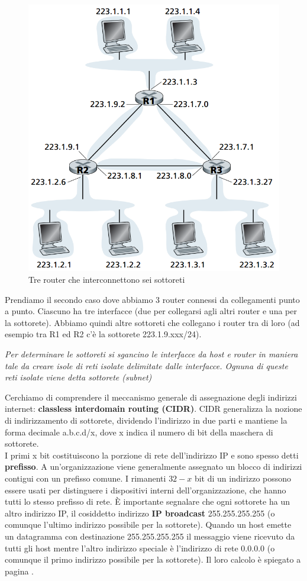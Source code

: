 \documentclass[11pt,a4paper]{book}
\begin{document}
\begin{figure}
	\includegraphics[scale=0.6]{img/055.png}
	\caption{Tre router che interconnettono sei sottoreti}
\end{figure}
Prendiamo il secondo caso dove abbiamo 3 router connessi da collegamenti punto a punto. Ciascuno ha tre interfacce (due per collegarsi agli altri router e una per la sottorete). Abbiamo quindi altre sottoreti che collegano i router tra di loro (ad esempio tra R1 ed R2 c'è la sottorete 223.1.9.xxx/24).
\begin{center}
	\textit{Per determinare le sottoreti si sgancino le interfacce da host e router in maniera tale da creare isole di reti isolate delimitate dalle interfacce. Ognuna di queste reti isolate viene detta sottorete (subnet)}
\end{center}
Cerchiamo di comprendere il meccanismo generale di assegnazione degli indirizzi internet: \textbf{classless interdomain routing (CIDR)}. CIDR generalizza la nozione di indirizzamento di sottorete, dividendo l'indirizzo in due parti e mantiene la forma decimale a.b.c.d/x, dove x indica il numero di bit della maschera di sottorete. \\
I primi x bit costituiscono la porzione di rete dell'indirizzo IP e sono spesso detti \textbf{prefisso}. A un'organizzazione viene generalmente assegnato un blocco di indirizzi contigui con un prefisso comune. I rimanenti $32-x$ bit di un indirizzo possono essere usati per distinguere i dispositivi interni dell'organizzazione, che hanno tutti lo stesso prefisso di rete. È importante segnalare che ogni sottorete ha un altro indirizzo IP, il cosiddetto indirizzo \textbf{IP broadcast} 255.255.255.255 (o comunque l'ultimo indirizzo possibile per la sottorete). Quando un host emette un datagramma con destinazione 255.255.255.255 il messaggio viene ricevuto da tutti gli host mentre l'altro indirizzo speciale è l'indirizzo di rete 0.0.0.0 (o comunque il primo indirizzo possibile per la sottorete). Il loro calcolo è spiegato a pagina \pageref{pag: 001}.
\end{document}

